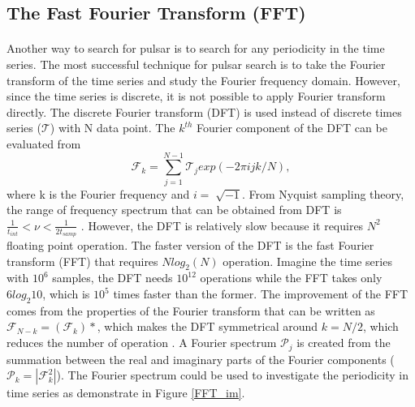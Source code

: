 \documentclass[thesis_msc.tex]{subfiles}
\begin{document}
    	\subsection{The Fast Fourier Transform (FFT)} \label{FFT}
        \paragraph{} Another way to search for pulsar is to search for any periodicity in the time series. The most successful technique for pulsar search is to take the Fourier transform of the time series and study the Fourier frequency domain. However, since the time series is discrete, it is not possible to apply Fourier transform directly. The discrete Fourier transform (DFT) is used instead of discrete times series ($\mathcal{T}$) with N data point. The $k^{th}$ Fourier component of the DFT can be evaluated from        
 \begin{equation}
 \mathcal{F}_k=\sum_{j=1}^{N-1} \mathcal{T}_j exp(-2\pi ijk/N), 
 \end{equation}
 where k is the Fourier frequency and $i = \sqrt[]{-1}$. From Nyquist sampling theory, the range of frequency spectrum that can be obtained from DFT is $\frac{1}{t_{int}}<\nu<\frac{1}{2 t_{samp}}$ \citep{ransom2002fourier}. However, the DFT is relatively slow because it requires $N^2$ floating point operation. The faster version of the DFT is the fast Fourier transform (FFT) that requires $Nlog_2(N)$ operation. Imagine the time series with $10^6$ samples, the DFT needs $10^{12}$ operations while the FFT takes only $6log_2 10$, which is $10^5$ times faster than the former. The improvement of the FFT comes from the properties of the Fourier transform that can be written as $\mathcal{F}_{N-k}=(\mathcal{F}_k)*$, which makes the DFT symmetrical around $k=N/2$, which reduces the number of operation \citep{FFT}. A Fourier spectrum $\mathcal{P}_j$ is created from the summation between the real and imaginary parts of the Fourier components ($\mathcal{P}_k=|\mathcal{F}_k^2|$). The Fourier spectrum could be used to investigate the periodicity in time series as demonstrate in Figure \ref{FFT_im}.  
 
\end{document}
